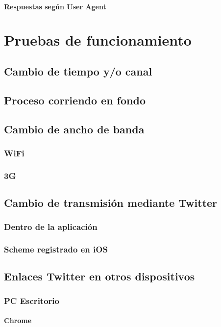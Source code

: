 		\subsubsection{Respuestas según User Agent}
		
\chapter{Pruebas de funcionamiento}

\section{Cambio de tiempo y/o canal}
\section{Proceso corriendo en fondo} %
\section{Cambio de ancho de banda}
	\subsection{WiFi}
	\subsection{3G}
\section{Cambio de transmisión mediante Twitter}
	\subsection{Dentro de la aplicación}
	\subsection{Scheme registrado en iOS}
\section{Enlaces Twitter en otros dispositivos}
	\subsection{PC Escritorio}
		\subsubsection{Chrome}
